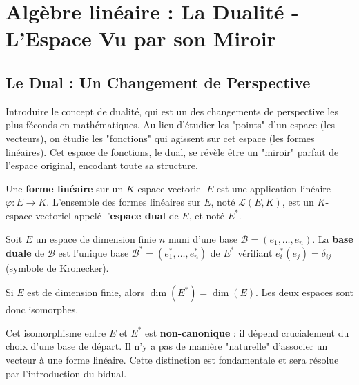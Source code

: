 \chapter{Algèbre linéaire : La Dualité - L'Espace Vu par son Miroir}

\section{Le Dual : Un Changement de Perspective}

\begin{objectif}
    Introduire le concept de dualité, qui est un des changements de perspective les plus féconds en mathématiques. Au lieu d'étudier les "points" d'un espace (les vecteurs), on étudie les "fonctions" qui agissent sur cet espace (les formes linéaires). Cet espace de fonctions, le dual, se révèle être un "miroir" parfait de l'espace original, encodant toute sa structure.
\end{objectif}

\begin{definition}
    Une \textbf{forme linéaire} sur un $K$-espace vectoriel $E$ est une application linéaire $\varphi: E \to K$.
    L'ensemble des formes linéaires sur $E$, noté $\mathcal{L}(E,K)$, est un $K$-espace vectoriel appelé l'\textbf{espace dual} de $E$, et noté $E^*$.
\end{definition}

\begin{definition}
    Soit $E$ un espace de dimension finie $n$ muni d'une base $\mathcal{B}=(e_1, \dots, e_n)$. La \textbf{base duale} de $\mathcal{B}$ est l'unique base $\mathcal{B}^*=(e_1^*, \dots, e_n^*)$ de $E^*$ vérifiant $e_i^*(e_j) = \delta_{ij}$ (symbole de Kronecker).
\end{definition}

\begin{corollary}
    Si $E$ est de dimension finie, alors $\dim(E^*) = \dim(E)$. Les deux espaces sont donc isomorphes.
\end{corollary}
\begin{remark}
    Cet isomorphisme entre $E$ et $E^*$ est \textbf{non-canonique} : il dépend crucialement du choix d'une base de départ. Il n'y a pas de manière "naturelle" d'associer un vecteur à une forme linéaire. Cette distinction est fondamentale et sera résolue par l'introduction du bidual.
\end{remark}

